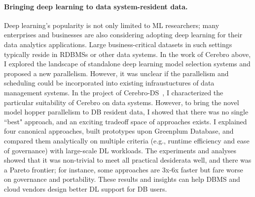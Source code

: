 \documentclass[letterpaper]{article}
\begin{document}
\paragraph{Bringing deep learning to data system-resident data.}
Deep learning's popularity is not only limited to ML researchers; many enterprises and businesses are also considering adopting deep learning for their data analytics applications. Large business-critical
datasets in such settings typically reside in RDBMSs or other data
systems.  In the work of Cerebro above, I explored the landscape of standalone deep learning model selection systems and proposed a new parallelism. However, it was unclear if the parallelism and scheduling could be incorporated into existing infraustuctures of data management systems. In the project of Cerebro-DS~\cite{cerebro-ds}, I characterized the particular suitability of Cerebro on data systems. However, to bring the novel model hopper parallelism to DB resident data, I showed that there was no single ``best" approach, and
an exciting tradeoff space of approaches exists. I explained four
canonical approaches, built prototypes upon Greenplum Database, and compared them analytically on multiple criteria (e.g., runtime
efficiency and ease of governance) with large-scale DL workloads. The experiments and analyses showed
that it was non-trivial to meet all practical desiderata well, and there was
a Pareto frontier; for instance, some approaches are 3x-6x faster but
fare worse on governance and portability. These results and insights
can help DBMS and cloud vendors design better DL support for DB
users.
\end{document}
